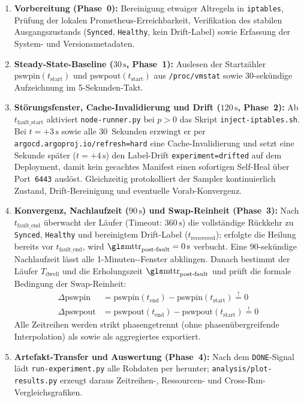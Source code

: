 \begin{enumerate}
\item \textbf{Vorbereitung (Phase~0):} Bereinigung etwaiger Altregeln in \texttt{iptables}, Prüfung der lokalen Prometheus-Erreichbarkeit, Verifikation des stabilen Ausgangszustands (\texttt{Synced}, \texttt{Healthy}, kein Drift-Label) sowie Erfassung der System- und Versionsmetadaten.
\item \textbf{Steady-State-Baseline ($30\,\text{s}$, Phase~1):} Auslesen der Startzähler $\text{pswpin}(t_{\text{start}})$ und $\text{pswpout}(t_{\text{start}})$ aus \texttt{/proc/vmstat} sowie 30-sekündige Aufzeichnung im 5-Sekunden-Takt.\autocite{kernel_vmstat_2026}
\item \textbf{Störungsfenster, Cache-Invalidierung und Drift ($120\,\text{s}$, Phase~2):} Ab $t_{\text{fault\_start}}$ aktiviert \texttt{node-runner.py} bei $p > 0$ das Skript \texttt{inject-iptables.sh}. Bei $t = +3\,\text{s}$ sowie alle 30~Sekunden erzwingt er per \texttt{argocd.argoproj.io/refresh=hard} eine Cache-Invalidierung und setzt eine Sekunde später ($t = +4\,\text{s}$) den Label-Drift \texttt{experiment=drifted} auf dem Deployment, damit kein gecachtes Manifest einen sofortigen Self-Heal über Port~\texttt{6443} auslöst. Gleichzeitig protokolliert der Sampler kontinuierlich Zustand, Drift-Bereinigung und eventuelle Vorab-Konvergenz.
\item \textbf{Konvergenz, Nachlaufzeit ($90\,\text{s}$) und Swap-Reinheit (Phase~3):} Nach $t_{\text{fault\_end}}$ überwacht der Läufer (Timeout: $360\,\text{s}$) die vollständige Rückkehr zu \texttt{Synced}, \texttt{Healthy} und bereinigtem Drift-Label ($t_{\text{recovered}}$); erfolgte die Heilung bereits vor $t_{\text{fault\_end}}$, wird $\text{\gl{mttr}}_{\text{post-fault}} = 0\,\text{s}$ verbucht. Eine 90-sekündige Nachlaufzeit lässt alle 1-Minuten--Fenster abklingen. Danach bestimmt der Läufer $T_{\text{dwell}}$ und die Erholungszeit $\text{\gl{mttr}}_{\text{post-fault}}$ und prüft die formale Bedingung der Swap-Reinheit:\autocite{kernel_vmstat_2026}
\begin{equation}
\begin{aligned}
\Delta\text{pswpin} &= \text{pswpin}(t_{\text{end}}) - \text{pswpin}(t_{\text{start}}) \stackrel{!}{=} 0 \\
\Delta\text{pswpout} &= \text{pswpout}(t_{\text{end}}) - \text{pswpout}(t_{\text{start}}) \stackrel{!}{=} 0
\end{aligned}
\label{eq:swap-purity-condition}
\end{equation}
Alle Zeitreihen werden strikt phasengetrennt (ohne phasenübergreifende Interpolation) als  sowie als aggregiertes  exportiert.
\item \textbf{Artefakt-Transfer und Auswertung (Phase~4):} Nach dem \texttt{DONE}-Signal lädt \texttt{run-experiment.py} alle Rohdaten per  herunter; \texttt{analysis/plot-results.py} erzeugt daraus Zeitreihen-, Ressourcen- und Cross-Run-Vergleichsgrafiken.
\end{enumerate}


